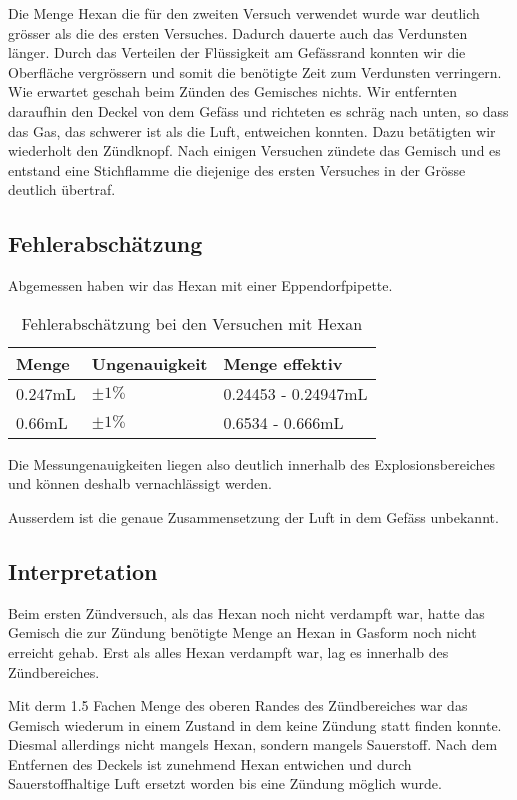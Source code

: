 \documentclass[11pt,paper=a4,final]{scrartcl}
\begin{document}
Die Menge Hexan die f\"ur den zweiten Versuch verwendet wurde war deutlich
gr\"osser als die des ersten Versuches. Dadurch dauerte auch das Verdunsten
l\"anger. Durch das Verteilen der Fl\"ussigkeit am Gef\"assrand konnten wir die
Oberfl\"ache vergr\"ossern und somit die ben\"otigte Zeit zum Verdunsten
verringern. Wie erwartet geschah beim Z\"unden des Gemisches nichts. Wir
entfernten daraufhin den Deckel von dem Gef\"ass und richteten es schr\"ag nach
unten, so dass das Gas, das schwerer ist als die Luft, entweichen konnten. Dazu
bet\"atigten wir wiederholt den Z\"undknopf. Nach einigen Versuchen z\"undete
das Gemisch und es entstand eine Stichflamme die diejenige des ersten Versuches
in der Gr\"osse deutlich \"ubertraf.
\subsection{Fehlerabsch\"atzung}
Abgemessen haben wir das Hexan mit einer Eppendorfpipette.
\begin{table}[h!]
  \centering
  \begin{tabular}{|l|l|l|}\hline
    \bf Menge	& \bf Ungenauigkeit	& \bf Menge effektiv	\\
    \hline
    0.247mL	& \(\pm 1\%\)	&	0.24453 - 0.24947mL	\\
    \hline
    0.66mL	& \(\pm 1\%\)	&	0.6534 - 0.666mL	\\
    \hline
  \end{tabular}
  \caption{Fehlerabsch\"atzung bei den Versuchen mit Hexan}
  \label{tab:}
\end{table}
Die Messungenauigkeiten liegen also deutlich innerhalb des Explosionsbereiches
und k\"onnen deshalb vernachl\"assigt werden.

Ausserdem ist die genaue Zusammensetzung der Luft in dem Gef\"ass unbekannt.
\subsection{Interpretation}
Beim ersten Z\"undversuch, als das Hexan noch nicht verdampft war, hatte das
Gemisch die zur Z\"undung ben\"otigte Menge an Hexan in Gasform noch nicht
erreicht gehab. Erst als alles Hexan verdampft war, lag es innerhalb des
Z\"undbereiches.

Mit derm 1.5 Fachen Menge des oberen Randes des Z\"undbereiches war das Gemisch
wiederum in einem Zustand in dem keine Z\"undung statt finden konnte. Diesmal
allerdings nicht mangels Hexan, sondern mangels Sauerstoff. Nach dem Entfernen
des Deckels ist zunehmend Hexan entwichen und durch Sauerstoffhaltige Luft
ersetzt worden bis eine Z\"undung m\"oglich wurde.
\end{document}
